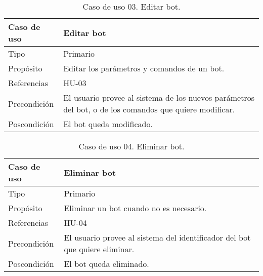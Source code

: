 \begin{table}[H]
    \centering
    \def\arraystretch{1.25}
    \begin{adjustbox}{max width=\textwidth}
    \begin{tabularx}{\textwidth}{l|L}
    \hline
        \textbf{Caso de uso} & \textbf{Editar bot} \\ \hline
    \hline
        Tipo & Primario \\ \hline
        Propósito & Editar los parámetros y comandos de un bot. \\ \hline
        Referencias & HU-03 \\ \hline
        Precondición & El usuario provee al sistema de los nuevos parámetros del bot, o de los comandos que quiere modificar. \\ \hline
        Poscondición & El bot queda modificado. \\ \hline
    \end{tabularx}
    \end{adjustbox}
    \caption{Caso de uso 03. Editar bot.}
\end{table}

\begin{table}[H]
    \centering
    \def\arraystretch{1.25}
    \begin{adjustbox}{max width=\textwidth}
    \begin{tabularx}{\textwidth}{l|L}
    \hline
        \textbf{Caso de uso} & \textbf{Eliminar bot} \\ \hline
    \hline
        Tipo & Primario \\ \hline
        Propósito & Eliminar un bot cuando no es necesario. \\ \hline
        Referencias & HU-04 \\ \hline
        Precondición & El usuario provee al sistema del identificador del bot que quiere eliminar. \\ \hline
        Poscondición & El bot queda eliminado. \\ \hline
    \end{tabularx}
    \end{adjustbox}
    \caption{Caso de uso 04. Eliminar bot.}
\end{table}


